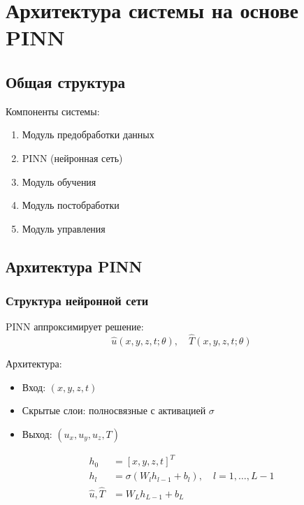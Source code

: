 \section{Архитектура системы на основе PINN}

\subsection{Общая структура}

Компоненты системы:

\begin{enumerate}
    \item Модуль предобработки данных
    \item PINN (нейронная сеть)
    \item Модуль обучения
    \item Модуль постобработки
    \item Модуль управления
\end{enumerate}

\subsection{Архитектура PINN}

\subsubsection{Структура нейронной сети}

PINN аппроксимирует решение:
\begin{equation}
\hat{u}(x, y, z, t; \theta), \quad \hat{T}(x, y, z, t; \theta)
\end{equation}

Архитектура:
\begin{itemize}
    \item Вход: $(x, y, z, t)$
    \item Скрытые слои: полносвязные с активацией $\sigma$
    \item Выход: $(u_x, u_y, u_z, T)$
\end{itemize}

\begin{equation}
\begin{aligned}
h_0 &= [x, y, z, t]^T \\
h_l &= \sigma(W_l h_{l-1} + b_l), \quad l = 1, \ldots, L-1 \\
\hat{u}, \hat{T} &= W_L h_{L-1} + b_L
\end{aligned}
\end{equation}

